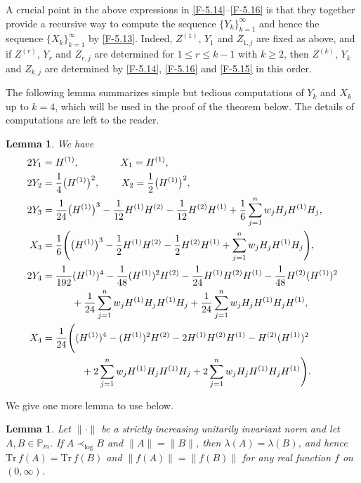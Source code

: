 \documentclass[11pt,reqno]{article}
\newtheorem{lemma}[theorem]{Lemma}
\numberwithin{equation}{section}
\def\bP{\mathbb{P}}
\def\Tr{\mathrm{Tr}}
\begin{document}
A crucial point in the above expressions in \eqref{F-5.14}--\eqref{F-5.16} is that they together provide
a recursive way to compute the sequence $\{Y_k\}_{k=1}^\infty$ and hence the sequence
$\{X_k\}_{k=1}^\infty$ by \eqref{F-5.13}. Indeed, $Z^{(1)}$, $Y_1$ and $Z_{1,j}$ are fixed as above,
and if $Z^{(r)}$, $Y_r$ and $Z_{r,j}$ are determined for $1\le r\le k-1$ with $k\ge2$, then
$Z^{(k)}$, $Y_k$ and $Z_{k,j}$ are determined by \eqref{F-5.14}, \eqref{F-5.16} and \eqref{F-5.15} in this
order.

The following lemma summarizes simple but tedious computations of $Y_k$ and $X_k$ up to $k=4$,
which will be used in the proof of the theorem below. The details of computations are left to the reader.

\begin{lemma}\label{L-5.2}
We have
\begin{align*}
2Y_1&=H^{(1)},\qquad\qquad\,X_1=H^{(1)}, \\
2Y_2&={1\over4}\bigl(H^{(1)}\bigr)^2,\qquad\,X_2={1\over2}\bigl(H^{(1)}\bigr)^2, \\
2Y_3&={1\over24}\bigl(H^{(1)}\bigr)^3-{1\over12}H^{(1)}H^{(2)}-{1\over12}H^{(2)}H^{(1)}
+{1\over6}\sum_{j=1}^nw_jH_jH^{(1)}H_j, \\
X_3&={1\over6}\Biggl(\bigl(H^{(1)}\bigr)^3-{1\over2}H^{(1)}H^{(2)}-{1\over2}H^{(2)}H^{(1)}
+\sum_{j=1}^nw_jH_jH^{(1)}H_j\Biggr), \\
2Y_4&={1\over192}(H^{(1)})^4-{1\over48}(H^{(1)})^2H^{(2)}-{1\over24}H^{(1)}H^{(2)}H^{(1)}
-{1\over48}H^{(2)}(H^{(1)})^2 \\
&\qquad\quad+{1\over24}\sum_{j=1}^nw_jH^{(1)}H_jH^{(1)}H_j
+{1\over24}\sum_{j=1}^nw_jH_jH^{(1)}H_jH^{(1)}, \\
X_4&={1\over24}\Biggl((H^{(1)})^4-(H^{(1)})^2H^{(2)}-2H^{(1)}H^{(2)}H^{(1)}
-H^{(2)}(H^{(1)})^2 \\
&\qquad\qquad+2\sum_{j=1}^nw_jH^{(1)}H_jH^{(1)}H_j
+2\sum_{j=1}^nw_jH_jH^{(1)}H_jH^{(1)}\Biggr).
\end{align*}
\end{lemma}

We give one more lemma to use below.

\begin{lemma}\label{L-5.3}
Let $\|\cdot\|$ be a strictly increasing unitarily invariant norm and let $A,B\in\bP_m$. If $A\prec_{\log}B$
and $\|A\|=\|B\|$, then $\lambda(A)=\lambda(B)$, and hence $\Tr\,f(A)=\Tr\,f(B)$ and $\|f(A)\|=\|f(B)\|$ for any
real function $f$ on $(0,\infty)$.
\end{lemma}
\end{document}
